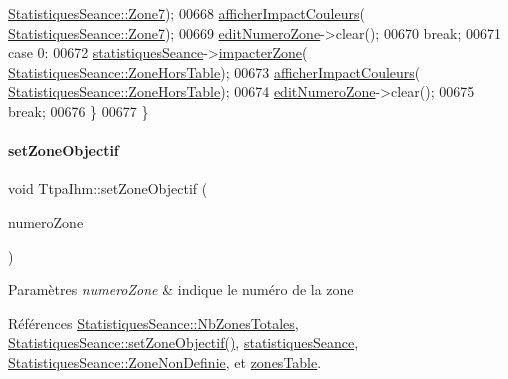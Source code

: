 \begin{DoxyCode}
      \hyperlink{class_statistiques_seance_aa839f5192cbadd7c3fb3651d62eff8b5a196adb885d7fd7109e451e759564ea64}{StatistiquesSeance::Zone7});
00668             \hyperlink{class_ttpa_ihm_a6e3cd3828ce5d165497e343bdb15cd87}{afficherImpactCouleurs}(
      \hyperlink{class_statistiques_seance_aa839f5192cbadd7c3fb3651d62eff8b5a196adb885d7fd7109e451e759564ea64}{StatistiquesSeance::Zone7});
00669             \hyperlink{class_ttpa_ihm_a843f5742ec2289d08e2be94dda2c9128}{editNumeroZone}->clear();
00670         \textcolor{keywordflow}{break};
00671         \textcolor{keywordflow}{case} 0:
00672             \hyperlink{class_ttpa_ihm_abed6897d6f7b4d3a5eb8dcc07651e740}{statistiquesSeance}->\hyperlink{class_statistiques_seance_adf93738ca1b6b117ac91b68772d2c4c8}{impacterZone}(
      \hyperlink{class_statistiques_seance_aa839f5192cbadd7c3fb3651d62eff8b5aeb6ef225df9153e1f46a968ae71bf2f3}{StatistiquesSeance::ZoneHorsTable});
00673             \hyperlink{class_ttpa_ihm_a6e3cd3828ce5d165497e343bdb15cd87}{afficherImpactCouleurs}(
      \hyperlink{class_statistiques_seance_aa839f5192cbadd7c3fb3651d62eff8b5aeb6ef225df9153e1f46a968ae71bf2f3}{StatistiquesSeance::ZoneHorsTable});
00674             \hyperlink{class_ttpa_ihm_a843f5742ec2289d08e2be94dda2c9128}{editNumeroZone}->clear();
00675         \textcolor{keywordflow}{break};
00676     \}
00677 \}
\end{DoxyCode}
\mbox{\label{class_ttpa_ihm_a3fd5b5d097f8a52df6fc8dd6d59b1374}} 
\paragraph{\texorpdfstring{set\+Zone\+Objectif}{setZoneObjectif}}
{\footnotesize\ttfamily void Ttpa\+Ihm\+::set\+Zone\+Objectif (\begin{DoxyParamCaption}\item[{Q\+String}]{numero\+Zone }\end{DoxyParamCaption})\hspace{0.3cm}{\ttfamily [slot]}}


\begin{DoxyParams}{Paramètres}
{\em numero\+Zone} & indique le numéro de la zone \\
\hline
\end{DoxyParams}


Références \hyperlink{class_statistiques_seance_aa839f5192cbadd7c3fb3651d62eff8b5afe19f73563963b5160847cdd8c2260c4}{Statistiques\+Seance\+::\+Nb\+Zones\+Totales}, \hyperlink{class_statistiques_seance_af7c8281e195c0822463e6747bd0695ef}{Statistiques\+Seance\+::set\+Zone\+Objectif()}, \hyperlink{class_ttpa_ihm_abed6897d6f7b4d3a5eb8dcc07651e740}{statistiques\+Seance}, \hyperlink{class_statistiques_seance_aa839f5192cbadd7c3fb3651d62eff8b5afaee4b0051f413cbba9651905daeba28}{Statistiques\+Seance\+::\+Zone\+Non\+Definie}, et \hyperlink{class_ttpa_ihm_af77d75f1aa3eb901b9410e5fc465ece8}{zones\+Table}.



